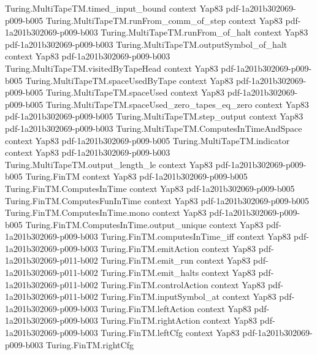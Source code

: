 \begin{theorem}
\proofstep
  {Turing.MultiTapeTM.timed_input_bound}
  {context}
  {Yap83}
  {pdf-1a201b302069-p009-b005}
\proofstep
  {Turing.MultiTapeTM.runFrom_comm_of_step}
  {context}
  {Yap83}
  {pdf-1a201b302069-p009-b003}
\proofstep
  {Turing.MultiTapeTM.runFrom_of_halt}
  {context}
  {Yap83}
  {pdf-1a201b302069-p009-b003}
\proofstep
  {Turing.MultiTapeTM.outputSymbol_of_halt}
  {context}
  {Yap83}
  {pdf-1a201b302069-p009-b003}
\proofstep
  {Turing.MultiTapeTM.visitedByTapeHead}
  {context}
  {Yap83}
  {pdf-1a201b302069-p009-b005}
\proofstep
  {Turing.MultiTapeTM.spaceUsedByTape}
  {context}
  {Yap83}
  {pdf-1a201b302069-p009-b005}
\proofstep
  {Turing.MultiTapeTM.spaceUsed}
  {context}
  {Yap83}
  {pdf-1a201b302069-p009-b005}
\proofstep
  {Turing.MultiTapeTM.spaceUsed_zero_tapes_eq_zero}
  {context}
  {Yap83}
  {pdf-1a201b302069-p009-b005}
\proofstep
  {Turing.MultiTapeTM.step_output}
  {context}
  {Yap83}
  {pdf-1a201b302069-p009-b003}
\proofstep
  {Turing.MultiTapeTM.ComputesInTimeAndSpace}
  {context}
  {Yap83}
  {pdf-1a201b302069-p009-b005}
\proofstep
  {Turing.MultiTapeTM.indicator}
  {context}
  {Yap83}
  {pdf-1a201b302069-p009-b003}
\proofstep
  {Turing.MultiTapeTM.output_length_le}
  {context}
  {Yap83}
  {pdf-1a201b302069-p009-b005}
\proofstep
  {Turing.FinTM}
  {context}
  {Yap83}
  {pdf-1a201b302069-p009-b005}
\proofstep
  {Turing.FinTM.ComputesInTime}
  {context}
  {Yap83}
  {pdf-1a201b302069-p009-b005}
\proofstep
  {Turing.FinTM.ComputesFunInTime}
  {context}
  {Yap83}
  {pdf-1a201b302069-p009-b005}
\proofstep
  {Turing.FinTM.ComputesInTime.mono}
  {context}
  {Yap83}
  {pdf-1a201b302069-p009-b005}
\proofstep
  {Turing.FinTM.ComputesInTime.output_unique}
  {context}
  {Yap83}
  {pdf-1a201b302069-p009-b003}
\proofstep
  {Turing.FinTM.computesInTime_iff}
  {context}
  {Yap83}
  {pdf-1a201b302069-p009-b003}
\proofstep
  {Turing.FinTM.emitAction}
  {context}
  {Yap83}
  {pdf-1a201b302069-p011-b002}
\proofstep
  {Turing.FinTM.emit_run}
  {context}
  {Yap83}
  {pdf-1a201b302069-p011-b002}
\proofstep
  {Turing.FinTM.emit_halts}
  {context}
  {Yap83}
  {pdf-1a201b302069-p011-b002}
\proofstep
  {Turing.FinTM.controlAction}
  {context}
  {Yap83}
  {pdf-1a201b302069-p011-b002}
\proofstep
  {Turing.FinTM.inputSymbol_at}
  {context}
  {Yap83}
  {pdf-1a201b302069-p009-b003}
\proofstep
  {Turing.FinTM.leftAction}
  {context}
  {Yap83}
  {pdf-1a201b302069-p009-b003}
\proofstep
  {Turing.FinTM.rightAction}
  {context}
  {Yap83}
  {pdf-1a201b302069-p009-b003}
\proofstep
  {Turing.FinTM.leftCfg}
  {context}
  {Yap83}
  {pdf-1a201b302069-p009-b003}
\proofstep
  {Turing.FinTM.rightCfg}

\end{theorem}
